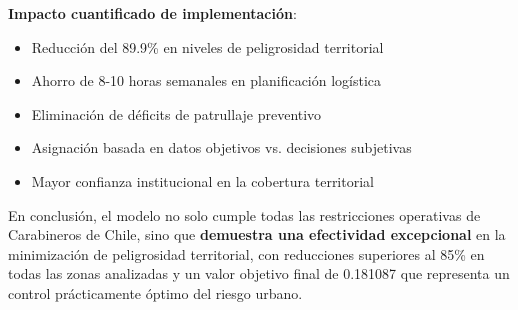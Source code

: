 \textbf{Impacto cuantificado de implementación}:
\begin{itemize}
    \item Reducción del 89.9\% en niveles de peligrosidad territorial
    \item Ahorro de 8-10 horas semanales en planificación logística
    \item Eliminación de déficits de patrullaje preventivo
    \item Asignación basada en datos objetivos vs. decisiones subjetivas
    \item Mayor confianza institucional en la cobertura territorial
\end{itemize}

En conclusión, el modelo no solo cumple todas las restricciones operativas de Carabineros de Chile, sino que \textbf{demuestra una efectividad excepcional} en la minimización de peligrosidad territorial, con reducciones superiores al 85\% en todas las zonas analizadas y un valor objetivo final de 0.181087 que representa un control prácticamente óptimo del riesgo urbano. 